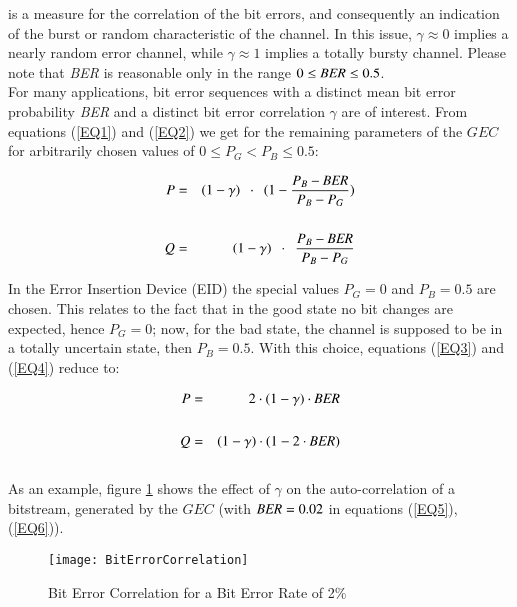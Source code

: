 is a measure for the correlation of the bit errors, and consequently an
indication of the burst or random characteristic of the channel. In
this issue, $\gamma \approx 0$ implies a nearly random error channel,
while $\gamma \approx 1$ implies a totally bursty channel. Please note
that {\em BER} is reasonable only in the range $0 \le \mbox{\em BER} \le 0.5$.\\

For many applications, bit error sequences with a distinct mean bit
error probability {\em BER} and a distinct bit error correlation
$\gamma$ are of interest. From equations (\ref{EQ1}) and (\ref{EQ2}) we
get for the remaining parameters of the $GEC$ for arbitrarily chosen
values of $0 \le P_G < P_B \le 0.5$:

\begin{eqnarray} \label{EQ3}
        P & = & (1-\gamma) \ \ \cdot \ \ (1-\frac{P_B-\BER}{P_B-P_G})\\
                                &&\nonumber \\
        Q & = & (1-\gamma) \ \ \cdot \ \ \frac{P_B-\BER}{P_B-P_G} \label{EQ4}
\end{eqnarray}

In the Error Insertion Device (EID) the special values $P_G=0$ and
$P_B=0.5$ are chosen. This relates to the fact that in the good state
no bit changes are expected, hence $P_G=0$; now, for the bad state, the
channel is supposed to be in a totally uncertain state, then $P_B=0.5$.
With this choice, equations (\ref{EQ3}) and (\ref{EQ4}) reduce to:

\begin{eqnarray} \label{EQ5}
                   P & = & 2 \cdot (1-\gamma) \cdot \mbox{\em BER} \\
                                && \nonumber\\
                   Q & = & (1-\gamma) \cdot (1-2 \cdot \mbox{\em BER}) \label{EQ6}
\end{eqnarray} \ \\

As an example, figure \ref{Gamma} shows the effect of $\gamma$ on the
auto-correlation of a bitstream, generated by the $GEC$ (with $\mbox{\em BER} = 0.02$
in equations (\ref{EQ5}),(\ref{EQ6})).

\begin{figure}[hb]
    \begin{center}
        \texttt{[image: BitErrorCorrelation]}
    \end{center}
    \caption{{\label{Gamma}} Bit Error
                Correlation for a Bit Error Rate of 2\%}
\end{figure}

